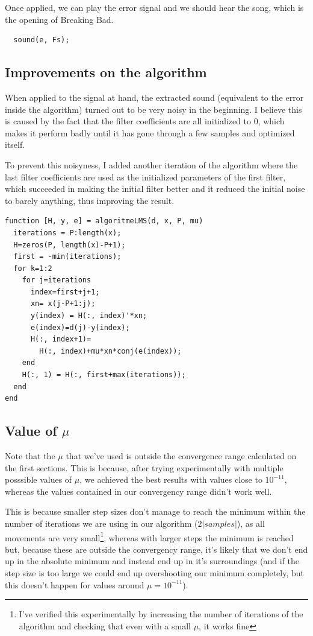 \documentclass[conference,9pt]{IEEEtran}
\begin{document}
Once applied, we can play the error signal and we should hear the song, which is the opening of Breaking Bad.
\begin{verbatim}
  sound(e, Fs);
\end{verbatim}

\subsection{Improvements on the algorithm}
When applied to the signal at hand, the extracted sound (equivalent to the error inside the algorithm) turned out to be very noisy in the beginning. I believe this is caused by the fact that the filter coefficients are all initialized to 0, which makes it perform badly until it has gone through a few samples and optimized itself.

To prevent this noisyness, I added another iteration of the algorithm where the last filter coefficients are used as the initialized parameters of the first filter, which succeeded in making the initial filter better and it reduced the initial noise to barely anything, thus improving the result.
\begin{verbatim}
function [H, y, e] = algoritmeLMS(d, x, P, mu)
  iterations = P:length(x);
  H=zeros(P, length(x)-P+1);
  first = -min(iterations);
  for k=1:2
    for j=iterations
      index=first+j+1;
      xn= x(j-P+1:j);
      y(index) = H(:, index)'*xn;
      e(index)=d(j)-y(index);
      H(:, index+1)=
        H(:, index)+mu*xn*conj(e(index));
    end
    H(:, 1) = H(:, first+max(iterations));
  end
end
\end{verbatim}

\subsection{Value of $\mu$}

Note that the $\mu$ that we've used is outside the convergence range calculated on the first sections. This is because, after trying experimentally with multiple posssible values of $\mu$, we achieved the best results with values close to $10^{-11}$, whereas the values contained in our convergency range didn't work well.

This is because smaller step sizes don't manage to reach the minimum within the number of iterations we are using in our algorithm ($2|samples|$), as all movements are very small\footnote{I've verified this experimentally by increasing the number of iterations of the algorithm and checking that even with a small $\mu$, it works fine}, whereas with larger steps the minimum is reached but, because these are outside the convergency range, it's likely that we don't end up in the absolute minimum and instead end up in it's surroundings (and if the step size is too large we could end up overshooting our minimum completely, but this doesn't happen for values around $\mu=10^{-11}$).
\end{document}
